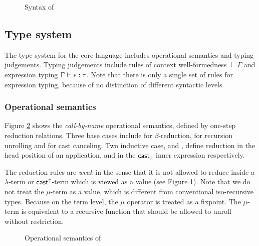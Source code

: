 \begin{figure}
    \gram{\otte\ottinterrule
        \ottG\ottinterrule
        \ottv}
    \caption{Syntax of \name}
    \label{fig:core:syntax}
\end{figure}

\subsection{Type system}\label{sec:core:type}
The type system for the core language includes operational semantics and typing judgements. Typing judgements include rules of context well-formedness $\vdash  \Gamma$ and expression typing $\Gamma  \vdash  \mathit{e}  :  \tau$. Note that there is only a single set of rules for expression typing, because of no distinction of different syntactic levels.

\subsubsection{Operational semantics}
Figure \ref{fig:core:opsem} shows the \emph{call-by-name} operational semantics, defined by one-step reduction relations. Three base cases include  for $\beta$-reduction,  for recursion unrolling and  for cast canceling. Two inductive case,  and , define reduction in the head position of an application, and in the $ \mathsf{cast}_{\downarrow} $ inner expression respectively.

The reduction rules are \emph{weak} in the sense that it is not allowed to reduce inside a $\lambda$-term or $ \mathsf{cast}^{\uparrow} $-term which is viewed as a value (see Figure \ref{fig:core:syntax}). Note that we do not treat the $ \mu $-term as a value, which is different from conventional iso-recursive types. Because on the term level, the $ \mu $ operator is treated as a fixpoint. The $ \mu $-term is equivalent to a recursive function that should be allowed to unroll without restriction.

\begin{figure}
    \ottdefnstep{}
    \caption{Operational semantics of \name}
    \label{fig:core:opsem}
\end{figure}

